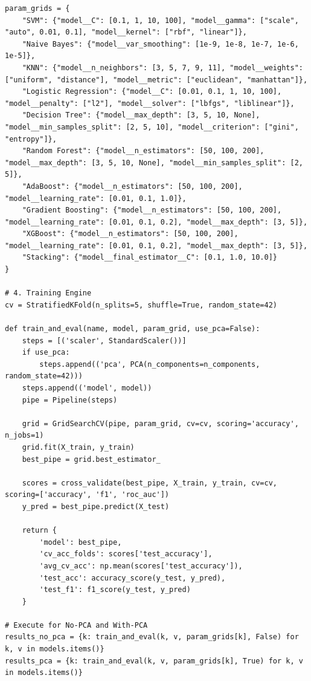 \documentclass[12pt,a4paper]{article}
\begin{document}
\begin{lstlisting}
param_grids = {
    "SVM": {"model__C": [0.1, 1, 10, 100], "model__gamma": ["scale", "auto", 0.01, 0.1], "model__kernel": ["rbf", "linear"]},
    "Naive Bayes": {"model__var_smoothing": [1e-9, 1e-8, 1e-7, 1e-6, 1e-5]},
    "KNN": {"model__n_neighbors": [3, 5, 7, 9, 11], "model__weights": ["uniform", "distance"], "model__metric": ["euclidean", "manhattan"]},
    "Logistic Regression": {"model__C": [0.01, 0.1, 1, 10, 100], "model__penalty": ["l2"], "model__solver": ["lbfgs", "liblinear"]},
    "Decision Tree": {"model__max_depth": [3, 5, 10, None], "model__min_samples_split": [2, 5, 10], "model__criterion": ["gini", "entropy"]},
    "Random Forest": {"model__n_estimators": [50, 100, 200], "model__max_depth": [3, 5, 10, None], "model__min_samples_split": [2, 5]},
    "AdaBoost": {"model__n_estimators": [50, 100, 200], "model__learning_rate": [0.01, 0.1, 1.0]},
    "Gradient Boosting": {"model__n_estimators": [50, 100, 200], "model__learning_rate": [0.01, 0.1, 0.2], "model__max_depth": [3, 5]},
    "XGBoost": {"model__n_estimators": [50, 100, 200], "model__learning_rate": [0.01, 0.1, 0.2], "model__max_depth": [3, 5]},
    "Stacking": {"model__final_estimator__C": [0.1, 1.0, 10.0]}
}

# 4. Training Engine
cv = StratifiedKFold(n_splits=5, shuffle=True, random_state=42)

def train_and_eval(name, model, param_grid, use_pca=False):
    steps = [('scaler', StandardScaler())]
    if use_pca:
        steps.append(('pca', PCA(n_components=n_components, random_state=42)))
    steps.append(('model', model))
    pipe = Pipeline(steps)
    
    grid = GridSearchCV(pipe, param_grid, cv=cv, scoring='accuracy', n_jobs=1)
    grid.fit(X_train, y_train)
    best_pipe = grid.best_estimator_
    
    scores = cross_validate(best_pipe, X_train, y_train, cv=cv, scoring=['accuracy', 'f1', 'roc_auc'])
    y_pred = best_pipe.predict(X_test)
    
    return {
        'model': best_pipe,
        'cv_acc_folds': scores['test_accuracy'],
        'avg_cv_acc': np.mean(scores['test_accuracy']),
        'test_acc': accuracy_score(y_test, y_pred),
        'test_f1': f1_score(y_test, y_pred)
    }

# Execute for No-PCA and With-PCA
results_no_pca = {k: train_and_eval(k, v, param_grids[k], False) for k, v in models.items()}
results_pca = {k: train_and_eval(k, v, param_grids[k], True) for k, v in models.items()}
\end{lstlisting}
\end{document}
